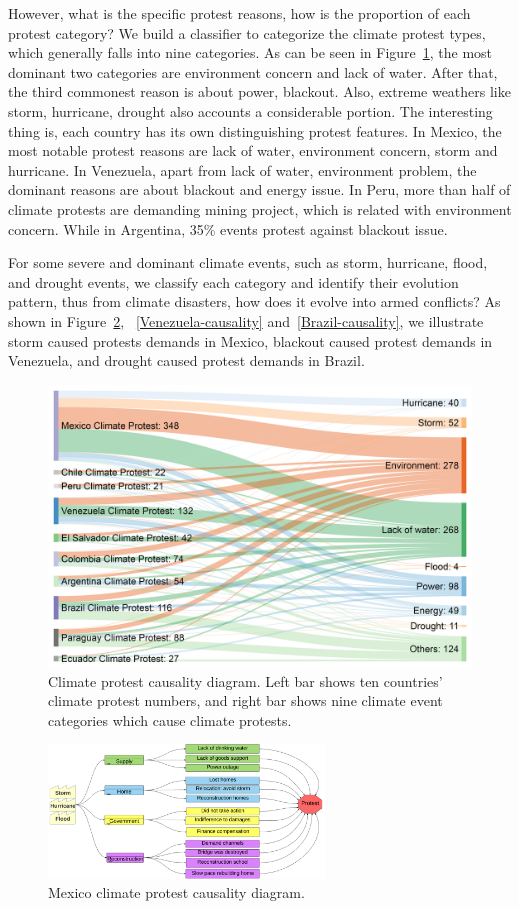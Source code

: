 \documentclass[9pt,twocolumn,twoside]{pnas-new}
\begin{document}
However, what is the specific protest reasons, how is the proportion of each protest category? We build a classifier to categorize the climate protest types, which generally falls into nine categories. As can be seen in Figure~\ref{causality}, the most dominant two categories are environment concern and lack of water. After that, the third commonest reason is about power, blackout. Also, extreme weathers like storm, hurricane, drought also accounts a considerable portion. The interesting thing is, each country has its own distinguishing protest features. In Mexico, the most notable protest reasons are lack of water, environment concern, storm and hurricane. In Venezuela, apart from lack of water, environment problem, the dominant reasons are about blackout and energy issue. In Peru, more than half of climate protests are demanding mining project, which is related with environment concern. While in Argentina, 35\% events protest against blackout issue.

For some severe and dominant climate events, such as storm, hurricane, flood, and drought events, we classify each category and identify their evolution pattern, thus from climate disasters, how does it evolve into armed conflicts? As shown in Figure~\ref{Mexico-causality}, ~\ref{Venezuela-causality} and~\ref{Brazil-causality}, we illustrate storm caused protests demands in Mexico, blackout caused protest demands in Venezuela, and drought caused protest demands in Brazil.

\begin{figure}[ht]
\centerline
{\includegraphics[width=.4\textwidth]{figures/causality1}}
\caption{Climate protest causality diagram. Left bar shows ten countries' climate protest numbers, and right bar shows nine climate event categories which cause climate protests.}
\label{causality}
\end{figure}


\begin{figure}[ht]
\centerline
{\includegraphics[height=1.4in]{figures/Mexico-diagram2}}
\caption{Mexico climate protest causality diagram.}
\label{Mexico-causality}
\end{figure}
\end{document}
